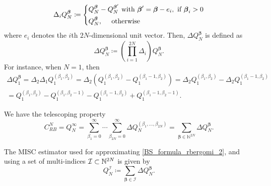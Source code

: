 %




\begin{equation}
\Delta_i Q_N^{\boldsymbol{\beta}} \coloneqq \left\{ 
\aligned 
 Q_N^{\boldsymbol{\beta}} &- Q_N^{\boldsymbol{\beta}'}  \text{ with } \boldsymbol{\beta}' =\boldsymbol{\beta} - e_i, \text{ if } \boldsymbol{\beta}_i>0 \\
 Q_N^{\boldsymbol{\beta}} &, \quad  \text{ otherwise}
\endaligned
\right.
\end{equation}
where $e_i$ denotes the $i$th $2N$-dimensional unit vector. Then, $\Delta
Q_N^{\boldsymbol{\beta}}$ is defined as
\begin{equation}
\Delta Q_N^{\boldsymbol{\beta}} \coloneqq \left( \prod_{i=1}^{2N} \Delta_i \right) Q_N^{\boldsymbol{\beta}}.
\end{equation}
For instance, when $N = 1$, then 
\begin{multline*}
	\Delta Q_1^{\boldsymbol{\beta}} = \Delta_2 \Delta_1 Q_1^{(\beta_1, \beta_2)} = \Delta_2\left( Q_1^{(\beta_1,
		\beta_2)} - Q_1^{(\beta_1-1,\beta_2)} \right) = \Delta_2 Q_1^{(\beta_1,
		\beta_2)} - \Delta_2 Q_1^{(\beta_1-1,\beta_2)} 
	\\= Q_1^{(\beta_1, \beta_2)} - Q_1^{(\beta_1, \beta_2-1)} - Q_1^{(\beta_1-1, \beta_2)} + Q_1^{(\beta_1-1, \beta_2-1)}.
\end{multline*}

We have the telescoping property
\begin{equation}
C_{RB}^{N}=Q_N^\infty = \sum_{\beta_1=0}^\infty \cdots \sum_{\beta_{2N} = 0}^\infty \Delta
Q_N^{(\beta_1, \ldots, \beta_{2N})} = \sum_{\boldsymbol{\beta} \in \mathbb{N}^{2N}} \Delta Q_N^{\boldsymbol{\beta}}.
\end{equation}


 The MISC estimator used for approximating \eqref{BS_formula_rbergomi_2}, and using a set of multi-indices $\mathcal{I}\subset \mathbb{N}^{2N}$ is given by
\begin{equation*}
	Q_N^{\mathcal{I}} \coloneqq \sum_{\boldsymbol{\beta} \in \mathcal{I}} \Delta Q_N^{\boldsymbol{\beta}}.
\end{equation*}

